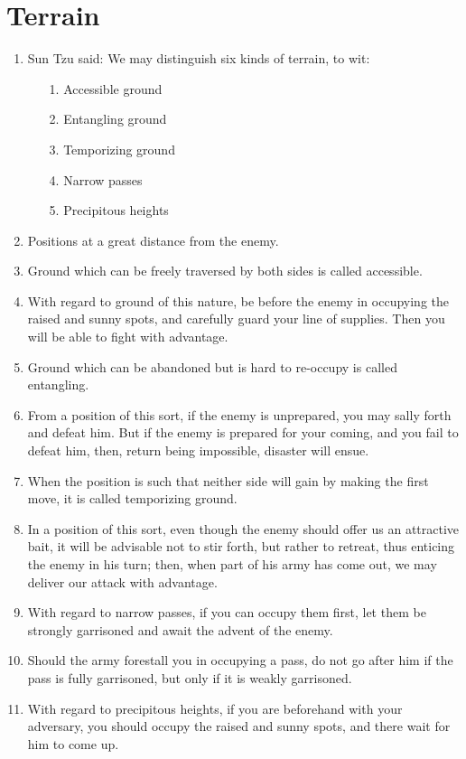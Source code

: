 \documentclass[oneside]{book}
\begin{document}
\chapter{Terrain}
\begin{enumerate}
	\item Sun Tzu said: We may distinguish six kinds of terrain, to wit:
	\begin{enumerate}
		\item[1.] Accessible ground
		\item[2.] Entangling ground
		\item[3.] Temporizing ground
		\item[4.] Narrow passes
		\item[5.] Precipitous heights
	\end{enumerate}
	\item Positions at a great distance from the enemy.
	\item Ground which can be freely traversed by both sides is called accessible.
	\item With regard to ground of this nature, be before the enemy in occupying the raised and sunny spots, and carefully guard your line of supplies. Then you will be able to fight with advantage.
	\item Ground which can be abandoned but is hard to re-occupy is called entangling.
	\item From a position of this sort, if the enemy is unprepared, you may sally forth and defeat him. But if the enemy is prepared for your coming, and you fail to defeat him, then, return being impossible, disaster will ensue.
	\item When the position is such that neither side will gain by making the first move, it is called temporizing ground.
	\item In a position of this sort, even though the enemy should offer us an attractive bait, it will be advisable not to stir forth, but rather to retreat, thus enticing the enemy in his turn; then, when part of his army has come out, we may deliver our attack with advantage.
	\item With regard to narrow passes, if you can occupy them first, let them be strongly garrisoned and await the advent of the enemy.
	\item Should the army forestall you in occupying a pass, do not go after him if the pass is fully garrisoned, but only if it is weakly garrisoned.
	\item With regard to precipitous heights, if you are beforehand with your adversary, you should occupy the raised and sunny spots, and there wait for him to come up.

\end{enumerate}
\end{document}
